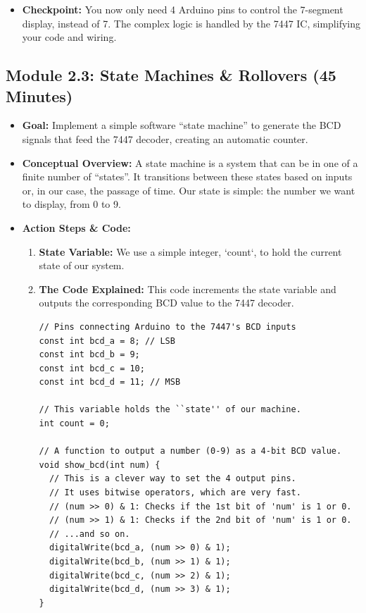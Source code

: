 \documentclass[11pt,a4paper]{article}
\begin{document}
\begin{itemize}
    \item \textbf{Checkpoint:} You now only need 4 Arduino pins to control the 7-segment display, instead of 7. The complex logic is handled by the 7447 IC, simplifying your code and wiring.
\end{itemize}
\newpage
\subsection*{Module 2.3: State Machines \& Rollovers (45 Minutes)}

\begin{itemize}
    \item \textbf{Goal:} Implement a simple software ``state machine'' to generate the BCD signals that feed the 7447 decoder, creating an automatic counter.
    \item \textbf{Conceptual Overview:} A state machine is a system that can be in one of a finite number of ``states''. It transitions between these states based on inputs or, in our case, the passage of time. Our state is simple: the number we want to display, from 0 to 9.
    \item \textbf{Action Steps \& Code:}
    \begin{enumerate}
        \item \textbf{State Variable:} We use a simple integer, `count`, to hold the current state of our system.
        \item \textbf{The Code Explained:} This code increments the state variable and outputs the corresponding BCD value to the 7447 decoder.
\begin{lstlisting}[caption={Code for Module 2.3: 0-9 BCD Counter}]
// Pins connecting Arduino to the 7447's BCD inputs
const int bcd_a = 8; // LSB
const int bcd_b = 9;
const int bcd_c = 10;
const int bcd_d = 11; // MSB

// This variable holds the ``state'' of our machine.
int count = 0;

// A function to output a number (0-9) as a 4-bit BCD value.
void show_bcd(int num) {
  // This is a clever way to set the 4 output pins.
  // It uses bitwise operators, which are very fast.
  // (num >> 0) & 1: Checks if the 1st bit of 'num' is 1 or 0.
  // (num >> 1) & 1: Checks if the 2nd bit of 'num' is 1 or 0.
  // ...and so on.
  digitalWrite(bcd_a, (num >> 0) & 1);
  digitalWrite(bcd_b, (num >> 1) & 1);
  digitalWrite(bcd_c, (num >> 2) & 1);
  digitalWrite(bcd_d, (num >> 3) & 1);
}


\end{lstlisting}
\end{enumerate}
\end{itemize}
\end{document}
